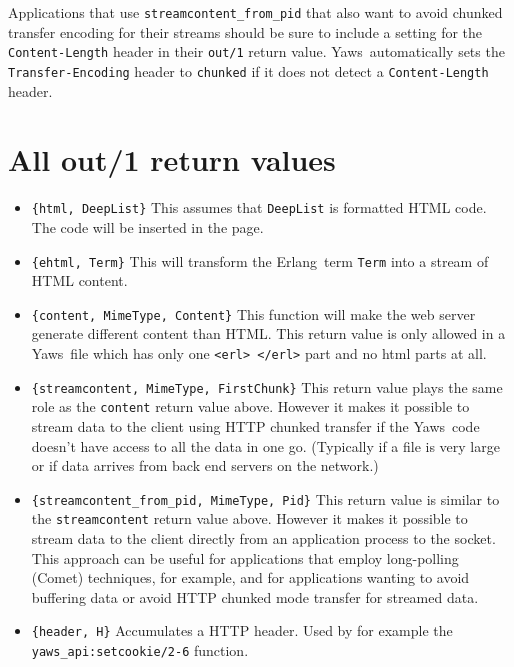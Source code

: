 \documentclass[11pt,oneside,english]{book}
\newcommand{\Erlang}            %
        {{\sc Erlang}}
\newcommand{\Yaws}            %
        {{\sc Yaws}}
\begin{document}
App\-li\-ca\-tions that use \verb+streamcontent_from_pid+ that also
want to a\-void chunked transfer encoding for their streams should be
sure to include a setting for the \verb+Content-Length+ header in
their \verb+out/1+ return value. \Yaws\ automatically sets
the \verb+Transfer-Encoding+ header to \verb+chunked+ if it does not
detect a \verb+Content-Length+ header.

\section{All out/1 return values}

\begin{itemize}


\item \verb+{html, DeepList}+ This assumes that \verb+DeepList+ is
  formatted HTML code.  The code will be inserted in the page.

\item \verb+{ehtml, Term}+ This will transform the \Erlang\ term
  \verb+Term+ into a stream of HTML content.

\item \verb+{content, MimeType, Content}+ This function will make the
  web server generate different content than HTML. This return value
  is only allowed in a \Yaws\ file which has only one
  \verb+<erl> </erl>+ part and no html parts at all.

\item \verb+{streamcontent, MimeType, FirstChunk}+ This return value
  plays the same role as the \verb+content+ return value above.
  However it makes it possible to stream data to the client using HTTP
  chunked transfer if the \Yaws\ code doesn't have access to all the
  data in one go. (Typically if a file is very large or if data
  arrives from back end servers on the network.)

\item \verb+{streamcontent_from_pid, MimeType, Pid}+ This return value
  is similar to the \verb+streamcontent+ return value above.  However
  it makes it possible to stream data to the client directly from an
  application process to the socket. This approach can be useful for
  applications that employ long-polling (Comet) techniques, for
  example, and for applications wanting to avoid buffering data or
  avoid HTTP chunked mode transfer for streamed data.

\item \verb+{header, H}+ Accumulates a HTTP header. Used by for
  example the \verb+yaws_api:setcookie/2-6+ function.


\end{itemize}
\end{document}
